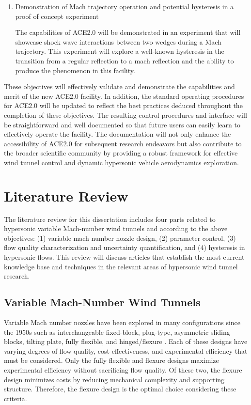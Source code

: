 \begin{enumerate}[listparindent=\parindent]
    \item Demonstration of Mach trajectory operation and potential hysteresis in a proof of concept experiment

        The capabilities of ACE2.0 will be demonstrated in an experiment that will showcase shock wave interactions between two wedges during a Mach trajectory. This experiment will explore a well-known hysteresis in the transition from a regular reflection to a mach reflection and the ability to produce the phenomenon in this facility. 

\end{enumerate}

These objectives will effectively validate and demonstrate the capabilities and merit of the new ACE2.0 facility. In addition, the standard operating procedures for ACE2.0 will be updated to reflect the best practices deduced throughout the completion of these objectives. The resulting control procedures and interface will be straightforward and well documented so that future users can easily learn to effectively operate the facility. The documentation will not only enhance the accessibility of ACE2.0 for subsequent research endeavors but also contribute to the broader scientific community by providing a robust framework for effective wind tunnel control and dynamic hypersonic vehicle aerodynamics exploration.

\section{Literature Review}

The literature review for this dissertation includes four parts related to hypersonic variable Mach-number wind tunnels and according to the above objectives: (1) variable mach number nozzle design, (2) parameter control, (3) flow quality characterization and uncertainty quantification, and (4) hysteresis in hypersonic flows. This review will discuss articles that establish the most current knowledge base and techniques in the relevant areas of hypersonic wind tunnel research.

\subsection{Variable Mach-Number Wind Tunnels}
Variable Mach number nozzles have been explored in many configurations since the 1950s such as interchangeable fixed-block, plug-type, asymmetric sliding blocks, tilting plate, fully flexible, and hinged/flexure \cite{agard-ag-3}. Each of these designs have varying degrees of flow quality, cost effectiveness, and experimental efficiency that must be considered. Only the fully flexible and flexure designs maximize experimental efficiency without sacrificing flow quality. Of these two, the flexure design minimizes costs by reducing mechanical complexity and supporting structure. Therefore, the flexure design is the optimal choice considering these criteria.

